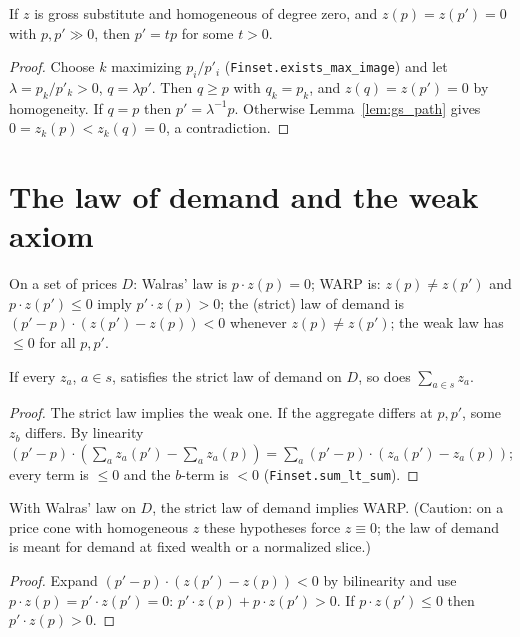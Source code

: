 \begin{theorem}
\label{thm:gs_unique}
\leanok
{}
If $z$ is gross substitute and homogeneous of degree zero, and $z(p) = z(p') = 0$ with $p, p' \gg 0$, then
$p' = t p$ for some $t > 0$.
\end{theorem}
\begin{proof}
\leanok
{}
Choose $k$ maximizing $p_i/p'_i$ (\texttt{Finset.exists\_max\_image}) and let $\lambda = p_k / p'_k > 0$, $q = \lambda p'$.
Then $q \ge p$ with $q_k = p_k$, and $z(q) = z(p') = 0$ by homogeneity. If $q = p$ then $p' = \lambda^{-1} p$. Otherwise
Lemma~\ref{lem:gs_path} gives $0 = z_k(p) < z_k(q) = 0$, a contradiction.
\end{proof}

\section{The law of demand and the weak axiom}
\label{sec:law_of_demand}

\begin{definition}
\label{def:law_of_demand}
\leanok
On a set of prices $D$: Walras' law is $p \cdot z(p) = 0$; WARP is: $z(p) \ne z(p')$ and $p \cdot z(p') \le 0$ imply
$p' \cdot z(p) > 0$; the (strict) law of demand is $(p' - p) \cdot (z(p') - z(p)) < 0$ whenever $z(p) \ne z(p')$; the
weak law has $\le 0$ for all $p, p'$.
\end{definition}

\begin{theorem}
\label{thm:lod_sum}
\leanok
{}
If every $z_a$, $a \in s$, satisfies the strict law of demand on $D$, so does $\sum_{a\in s} z_a$.
\end{theorem}
\begin{proof}
\leanok
The strict law implies the weak one. If the aggregate differs at $p, p'$, some $z_b$ differs. By linearity
$(p'-p)\cdot(\sum_a z_a(p') - \sum_a z_a(p)) = \sum_a (p'-p)\cdot(z_a(p') - z_a(p))$; every term is $\le 0$ and the
$b$-term is $< 0$ (\texttt{Finset.sum\_lt\_sum}).
\end{proof}

\begin{lemma}
\label{lem:lod_warp}
\leanok
{}
With Walras' law on $D$, the strict law of demand implies WARP. (Caution: on a price cone with homogeneous $z$ these
hypotheses force $z \equiv 0$; the law of demand is meant for demand at fixed wealth or a normalized slice.)
\end{lemma}
\begin{proof}
\leanok
Expand $(p'-p)\cdot(z(p') - z(p)) < 0$ by bilinearity and use $p \cdot z(p) = p' \cdot z(p') = 0$:
$p' \cdot z(p) + p \cdot z(p') > 0$. If $p \cdot z(p') \le 0$ then $p' \cdot z(p) > 0$.
\end{proof}

